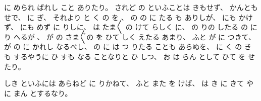 %
に
められ
ばれし
こと
ありたり。
%
されど
の
といふことは
きもせず、
%
かんともせで、
%
に
ぎ、
%
それより
と
く
の
を
%
、
%
の
の
に
たる
も
ありしが、
%
にも
かけず、
%
にも
めず
に
りしに、
%
は
たま〳〵
の
けて
らしく
に、
%
の
りの
したる
の
に
り
へるが
、
%
が
の
さま〴〵の
を
ひて
しく
えたる
あまり、
%
ふと
が
に
つきて、
%
が
の
に
かれし
なるべし、
%
の
に
は
つ
りたる
ことも
あらぬを、
%
に
く
の
き
も
するやうに
ひ
すも
なる
ことなりと
ひ
しつ、
%
お
は
らん
として
ひて
を
せたり。

%
しき
といふには
あらねど
に
りかねて、
%
ふと
また
を
けば、
%
は
き
に
きて
や
に
まん
とするなり。

